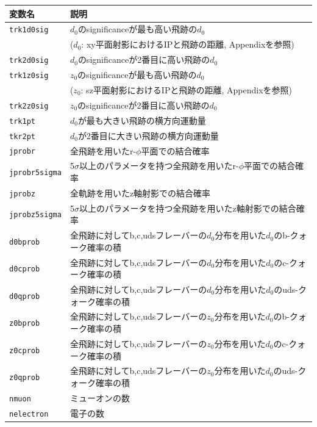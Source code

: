 \begin{table}[H]
 \centering
 \small
  \begin{tabular}{ l | l }
   \hline
   変数名 & 説明\\
   \hline \hline
   \texttt{trk1d0sig} & $d_0$のsignificanceが最も高い飛跡の$d_0$ \\
   & ($d_0$: xy平面射影におけるIPと飛跡の距離, Appendixを参照)\\
   \texttt{trk2d0sig} & $d_0$のsignificanceが2番目に高い飛跡の$d_0$\\
   \texttt{trk1z0sig} & $z_0$のsignificanceが最も高い飛跡の$d_0$ \\
   & ($z_0$: sz平面射影におけるIPと飛跡の距離, Appendixを参照)\\
   \texttt{trk2z0sig} & $z_0$のsignificanceが2番目に高い飛跡の$d_0$\\
   \texttt{trk1pt} & $d_0$が最も大きい飛跡の横方向運動量\\
   \texttt{tkr2pt} & $d_0$が2番目に大きい飛跡の横方向運動量\\
   \texttt{jprobr} & 全飛跡を用いたr-$\phi$平面での結合確率\\
   \texttt{jprobr5sigma} & 5$\sigma$以上のパラメータを持つ全飛跡を用いたr-$\phi$平面での結合確率\\
   \texttt{jprobz} & 全軌跡を用いたz軸射影での結合確率\\
   \texttt{jprobz5sigma} & 5$\sigma$以上のパラメータを持つ全飛跡を用いたz軸射影での結合確率\\
   \texttt{d0bprob} & 全飛跡に対してb,c,udsフレーバーの$d_0$分布を用いた$d_0$のb-クォーク確率の積\\
   \texttt{d0cprob} & 全飛跡に対してb,c,udsフレーバーの$d_0$分布を用いた$d_0$のc-クォーク確率の積\\
   \texttt{d0qprob} & 全飛跡に対してb,c,udsフレーバーの$d_0$分布を用いた$d_0$のuds-クォーク確率の積\\
   \texttt{z0bprob} & 全飛跡に対してb,c,udsフレーバーの$z_0$分布を用いた$d_0$のb-クォーク確率の積\\
   \texttt{z0cprob} & 全飛跡に対してb,c,udsフレーバーの$z_0$分布を用いた$d_0$のc-クォーク確率の積\\
   \texttt{z0qprob} & 全飛跡に対してb,c,udsフレーバーの$z_0$分布を用いた$d_0$のuds-クォーク確率の積\\
   \texttt{nmuon} & ミューオンの数\\
   \texttt{nelectron} & 電子の数\\

\end{tabular}
\end{table}
